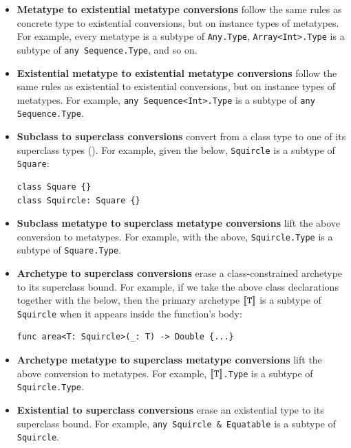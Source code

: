 \documentclass[../generics]{subfiles}
\begin{document}
\begin{itemize}
\item {}\textbf{Metatype to existential metatype conversions} follow the same rules as concrete type to existential conversions, but on instance types of metatypes. For example, every metatype is a subtype of \verb|Any.Type|, \verb|Array<Int>.Type| is a subtype of \verb|any Sequence.Type|, and so on.

\item {}\textbf{Existential metatype to existential metatype conversions} follow the same rules as existential to existential conversions, but on instance types of metatypes. For example, \verb|any Sequence<Int>.Type| is a subtype of \verb|any Sequence.Type|.

\item {}\textbf{Subclass to superclass conversions} convert from a class type to one of its superclass types (). For example, given the below, \verb|Squircle| is a subtype of \verb|Square|:
\begin{Verbatim}
class Square {}
class Squircle: Square {}
\end{Verbatim}

\item {}\textbf{Subclass metatype to superclass metatype conversions} lift the above conversion to metatypes. For example, with the above, \verb|Squircle.Type| is a subtype of \verb|Square.Type|.

\item {}\textbf{Archetype to superclass conversions} erase a class-constrained archetype to its superclass bound. For example, if we take the above class declarations together with the below, then the primary archetype $[\![\texttt{T}]\!]$ is a subtype of \verb|Squircle| when it appears inside the function's body:
\begin{Verbatim}
func area<T: Squircle>(_: T) -> Double {...}
\end{Verbatim}

\item {}\textbf{Archetype metatype to superclass metatype conversions} lift the above conversion to metatypes. For example, \texttt{$[\![\texttt{T}]\!]$.Type} is a subtype of \verb|Squircle.Type|.

\item {}\textbf{Existential to superclass conversions} erase an existential type to its superclass bound. For example, \verb|any Squircle & Equatable| is a subtype of \verb|Squircle|.


\end{itemize}
\end{document}
